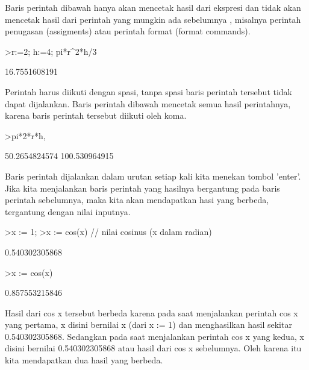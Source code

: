\documentclass{article}
\begin{document}
\begin{eulernotebook}
\begin{eulercomment}
Baris perintah dibawah hanya akan mencetak hasil dari ekspresi dan
tidak akan mencetak hasil dari perintah yang mungkin ada sebelumnya ,
misalnya perintah penugasan (assigments) atau perintah format (format
commands).

\end{eulercomment}
\begin{eulerprompt}
>r:=2; h:=4; pi*r^2*h/3
\end{eulerprompt}
\begin{euleroutput}
  16.7551608191
\end{euleroutput}
\begin{eulercomment}
Perintah harus diikuti dengan spasi, tanpa spasi baris perintah
tersebut tidak dapat dijalankan. Baris perintah dibawah mencetak semua
hasil perintahnya, karena baris perintah tersebut diikuti oleh koma.
\end{eulercomment}
\begin{eulerprompt}
>pi*2*r*h, %
\end{eulerprompt}
\begin{euleroutput}
  50.2654824574
  100.530964915
\end{euleroutput}
\begin{eulercomment}
Baris perintah dijalankan dalam urutan setiap kali kita menekan tombol
'enter'. Jika kita menjalankan baris perintah yang hasilnya bergantung
pada baris perintah sebelumnya, maka kita akan mendapatkan hasi yang
berbeda, tergantung dengan nilai inputnya.
\end{eulercomment}
\begin{eulerprompt}
>x := 1;
>x := cos(x) // nilai cosinus (x dalam radian)
\end{eulerprompt}
\begin{euleroutput}
  0.540302305868
\end{euleroutput}
\begin{eulerprompt}
>x := cos(x)
\end{eulerprompt}
\begin{euleroutput}
  0.857553215846
\end{euleroutput}
\begin{eulercomment}
Hasil dari cos x tersebut berbeda karena pada saat menjalankan
perintah cos x yang pertama, x disini bernilai x (dari x := 1) dan
menghasilkan hasil sekitar 0.540302305868. Sedangkan pada saat
menjalankan perintah cos x yang kedua, x disini bernilai
0.540302305868 atau hasil dari cos x sebelumnya. Oleh karena itu kita
mendapatkan dua hasil yang berbeda.


\end{eulercomment}
\end{eulernotebook}
\end{document}
